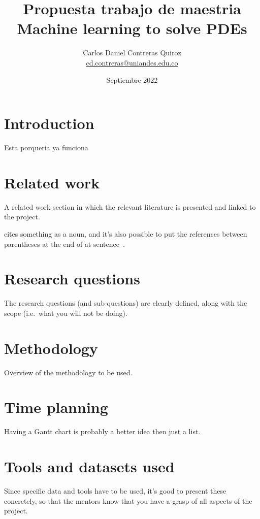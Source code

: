 \documentclass[a4paper,11pt]{scrartcl}
\title{Propuesta trabajo de maestria\\
Machine learning to solve PDEs}
\author{Carlos Daniel Contreras Quiroz\\ \url{cd.contreras@uniandes.edu.co}}
\date{Septiembre 2022}
\newcommand{\ie}{i.e.}
\begin{document}
	
	\maketitle
	
	
	\section{Introduction}
Esta porqueria ya funciona
	
	\section{Related work}
	A related work section in which the relevant literature is presented and linked to the project.
	
	\citet{Delaunay34} cites something as a noun, and it's also possible to put the references between parentheses at the end of at sentence~\citep{Voronoi08}.
	
	\section{Research questions}
	The research questions (and sub-questions) are clearly defined, along with the scope (\ie\ what you will not be doing).
	
	
	\section{Methodology}
	Overview of the methodology to be used.
	
	\section{Time planning}
	Having a Gantt chart is probably a better idea then just a list.
	
	\section{Tools and datasets used}
	Since specific data and tools have to be used, it’s good to present these concretely, so that the mentors know that you have a grasp of all aspects of the project.
	
	
	
	
\end{document}
